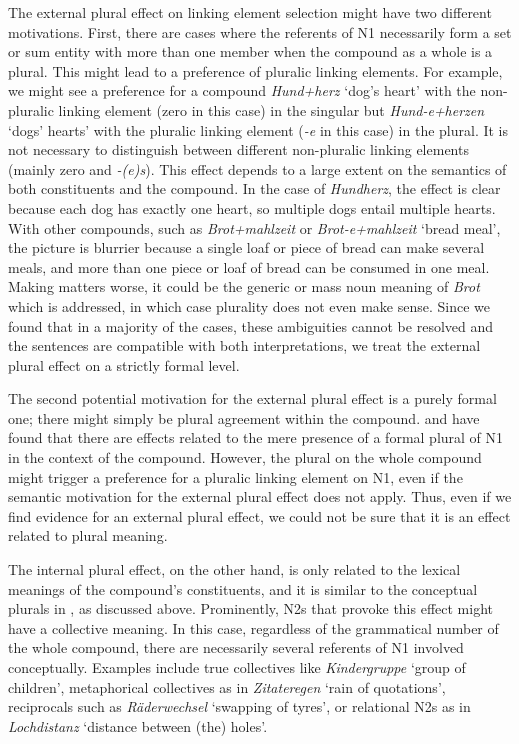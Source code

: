 \vspace{\baselineskip}

The external plural effect on linking element selection might have two different motivations.
First, there are cases where the referents of N1 necessarily form a set or sum entity with more than one member when the compound as a whole is a plural.
This might lead to a preference of pluralic linking elements.
For example, we might see a preference for a compound \textit{Hund+herz} `dog's heart' with the non-pluralic linking element (zero in this case) in the singular but \textit{Hund-e+herzen} `dogs' hearts' with the pluralic linking element (\textit{-e} in this case) in the plural.
It is not necessary to distinguish between different non-pluralic linking elements (mainly zero and \textit{-(e)s}).
This effect depends to a large extent on the semantics of both constituents and the compound.
In the case of \textit{Hundherz}, the effect is clear because each dog has exactly one heart, so multiple dogs entail multiple hearts.
With other compounds, such as \textit{Brot+mahlzeit} or \textit{Brot-e+mahlzeit} `bread meal', the picture is blurrier because a single loaf or piece of bread can make several meals, and more than one piece or loaf of bread can be consumed in one meal.
Making matters worse, it could be the generic or mass noun meaning of \textit{Brot} which is addressed, in which case plurality does not even make sense.
Since we found that in a majority of the cases, these ambiguities cannot be resolved and the sentences are compatible with both interpretations, we treat the external plural effect on a strictly formal level.

The second potential motivation for the external plural effect is a purely formal one; there might simply be plural agreement within the compound.
\citet{BangaEa2013a} and \citet{BangaEa2013b} have found that there are effects related to the mere presence of a formal plural of N1 in the context of the compound.
However, the plural on the whole compound might trigger a preference for a pluralic linking element on N1, even if the semantic motivation for the external plural effect does not apply.
Thus, even if we find evidence for an external plural effect, we could not be sure that it is an effect related to plural meaning.

The internal plural effect, on the other hand, is only related to the lexical meanings of the compound's constituents, and it is similar to the conceptual plurals in \citet{BangaEa2013b}, as discussed above.
Prominently, N2s that provoke this effect might have a collective meaning.
In this case, regardless of the grammatical number of the whole compound, there are necessarily several referents of N1 involved conceptually.
Examples include true collectives like \textit{Kindergruppe} `group of children', metaphorical collectives as in \textit{Zitateregen} `rain of quotations', reciprocals such as \textit{Räderwechsel} `swapping of tyres', or relational N2s as in \textit{Lochdistanz} `distance between (the) holes'.

